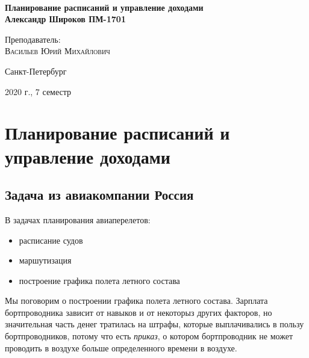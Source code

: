 \documentclass[%
10pt, %
final, %
oneside, %
onecolumn, %
centertags]{article} %
\theoremstyle{plain}
\theoremstyle{definition}
\theoremstyle{remark}
\begin{document}
\begin{titlepage} 
\begin{center}
\textbf{}\\[10.0cm]
\textbf{\LARGE Планирование расписаний и управление доходами}\\[0.5cm]
\textbf{\Large Александр Широков ПМ-1701} \\[0.2cm]


\begin{center} \large
{Преподаватель:} \\[0.5cm]
\textsc {Васильев Юрий Михайлович}\\
\end{center}

\vfill 



{\large {Санкт-Петербург}} \par
{\large {2020 г., 7 семестр}}
\end{center} 
\end{titlepage}

\begin{thebibliography}{3}
\end{thebibliography}
\tableofcontents
\newpage

\section{Планирование расписаний и управление доходами}

\subsection{Задача из авиакомпании Россия}

В задачах планирования авиаперелетов:

\begin{itemize}
	\item расписание судов
	\item маршутизация
	\item построение графика полета летного состава
\end{itemize}

Мы поговорим о построении графика полета летного состава. Зарплата бортпроводника зависит от навыков и от некоторыз других факторов, но значительная часть денег тратилась на штрафы, которые выплачивались в пользу бортпроводников, потому что есть \textit{приказ}, о котором бортпроводник не может проводить в воздухе больше определенного времени в воздухе. 
\end{document}
